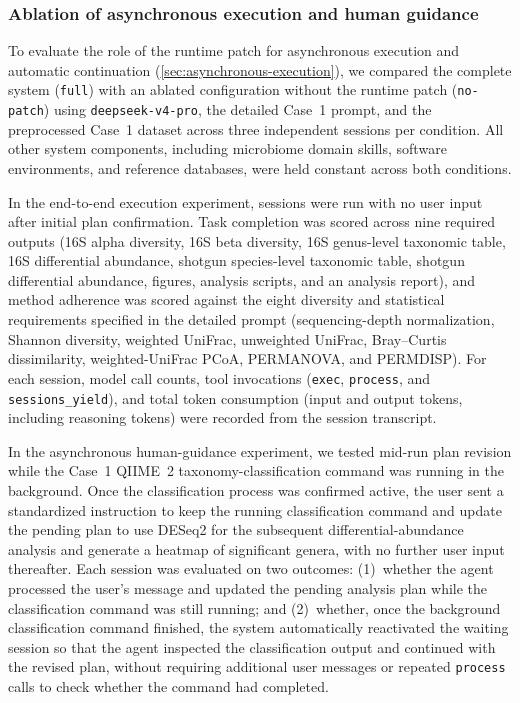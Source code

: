 \documentclass[10pt,letterpaper]{article}
\begin{document}
\subsubsection{Ablation of asynchronous execution and human guidance}

To evaluate the role of the runtime patch for asynchronous execution and
automatic continuation (\cref{sec:asynchronous-execution}), we compared the
complete system (\texttt{full}) with an ablated configuration without the
runtime patch (\texttt{no-patch}) using \texttt{deepseek-v4-pro}, the
detailed Case~1 prompt, and the preprocessed Case~1 dataset across three
independent sessions per condition.  All other system components, including
microbiome domain skills, software environments, and reference databases,
were held constant across both conditions.

In the end-to-end execution experiment, sessions were run with no user input
after initial plan confirmation.  Task completion was scored across nine
required outputs (16S alpha diversity, 16S beta diversity, 16S genus-level
taxonomic table, 16S differential abundance, shotgun species-level taxonomic
table, shotgun differential abundance, figures, analysis scripts, and an
analysis report), and method adherence was scored against the eight diversity
and statistical requirements specified in the detailed prompt
(sequencing-depth normalization, Shannon diversity, weighted UniFrac,
unweighted UniFrac, Bray--Curtis dissimilarity, weighted-UniFrac PCoA,
PERMANOVA, and PERMDISP).  For each session, model call counts, tool
invocations (\texttt{exec}, \texttt{process}, and \texttt{sessions\_yield}),
and total token consumption (input and output tokens, including reasoning
tokens) were recorded from the session transcript.

In the asynchronous human-guidance experiment, we tested mid-run plan
revision while the Case~1 QIIME~2 taxonomy-classification command was running
in the background.  Once the classification process was confirmed active, the
user sent a standardized instruction to keep the running classification
command and update the pending plan to use DESeq2 for the subsequent
differential-abundance analysis and generate a heatmap of significant genera,
with no further user input thereafter.  Each session was evaluated on two
outcomes: (1)~whether the agent processed the user's message and updated the
pending analysis plan while the classification command was still running; and
(2)~whether, once the background classification command finished, the system
automatically reactivated the waiting session so that the agent inspected the
classification output and continued with the revised plan, without requiring
additional user messages or repeated \texttt{process} calls to check whether
the command had completed.
\end{document}

